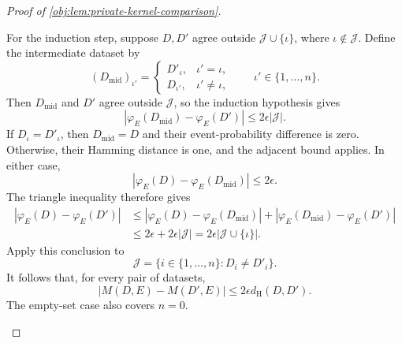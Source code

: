 \begin{proof}[Proof of \cref{obj:lem:private-kernel-comparison}]
\begin{enumerate}
For the induction step, suppose \(D,D'\) agree outside
\(\mathcal J\cup\{\iota\}\), where \(\iota\notin\mathcal J\). Define the intermediate dataset by
\[
(D_{\mathrm{mid}})_{\iota'}
=
\begin{cases}
D'_\iota,&\iota'=\iota,\\
D_{\iota'},&\iota'\ne\iota,
\end{cases}
\qquad \iota'\in\{1,\ldots,n\}.
\]
Then \(D_{\mathrm{mid}}\) and \(D'\) agree outside \(\mathcal J\), so the induction hypothesis gives
\[
|\varphi_E(D_{\mathrm{mid}})-\varphi_E(D')|
\le2\epsilon|\mathcal J|.
\]
If \(D_\iota=D'_\iota\), then \(D_{\mathrm{mid}}=D\) and their event-probability difference is zero. Otherwise, their Hamming distance is one, and the adjacent bound applies. In either case,
\[
|\varphi_E(D)-\varphi_E(D_{\mathrm{mid}})|\le2\epsilon.
\]
The triangle inequality therefore gives
\[
\begin{aligned}
|\varphi_E(D)-\varphi_E(D')|
&\le
|\varphi_E(D)-\varphi_E(D_{\mathrm{mid}})|
+
|\varphi_E(D_{\mathrm{mid}})-\varphi_E(D')|\\
&\le2\epsilon+2\epsilon|\mathcal J|
=2\epsilon|\mathcal J\cup\{\iota\}|.
\end{aligned}
\]
Apply this conclusion to
\[
\mathcal J=\{i\in\{1,\ldots,n\}:D_i\ne D'_i\}.
\]
It follows that, for every pair of datasets,
\[
|M(D,E)-M(D',E)|
\le2\epsilon d_{\mathrm H}(D,D').
\]
The empty-set case also covers \(n=0\).


\end{enumerate}
\end{proof}
